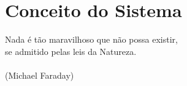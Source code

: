\chapter{Conceito do Sistema}
\label{chap:concep}
%

\begin{flushright}
  Nada é tão maravilhoso que não possa existir, \\
  se admitido pelas leis da Natureza. \\
  \ \\
  (Michael Faraday)
\end{flushright}



